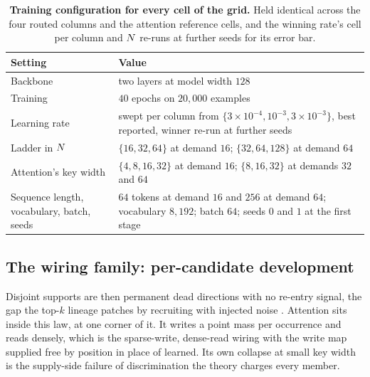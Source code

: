\begin{table}[H]
\centering
\scriptsize
\setlength{\tabcolsep}{3pt}
\caption{\textbf{Training configuration for every cell of the grid.} Held identical across the four routed columns and the attention reference cells, and the winning rate's cell per column and $N$ re-runs at further seeds for its error bar.}
\label{tab:recipe}
\begin{tabular}{@{}>{\raggedright\arraybackslash}p{3.4cm}>{\raggedright\arraybackslash}p{11.2cm}@{}}
\toprule
Setting & Value \\
\midrule
Backbone & two layers at model width $128$ \\
Training & $40$ epochs on $20{,}000$ examples \\
Learning rate & swept per column from $\{3 \times 10^{-4}, 10^{-3}, 3 \times 10^{-3}\}$, best reported, winner re-run at further seeds \\
Ladder in $N$ & $\{16, 32, 64\}$ at demand $16$; $\{32, 64, 128\}$ at demand $64$ \\
Attention's key width & $\{4, 8, 16, 32\}$ at demand $16$; $\{8, 16, 32\}$ at demands $32$ and $64$ \\
Sequence length, vocabulary, batch, seeds & $64$ tokens at demand $16$ and $256$ at demand $64$; vocabulary $8{,}192$; batch $64$; seeds $0$ and $1$ at the first stage \\
\bottomrule
\end{tabular}
\end{table}

\subsection{The wiring family: per-candidate development}
\label{apd:wirings}

Disjoint supports are then permanent dead directions with no re-entry signal, the gap the top-$k$ lineage patches by recruiting with injected noise \citep{shazeer2017moe}. Attention sits inside this law, at one corner of it. It writes a point mass per occurrence and reads densely, which is the sparse-write, dense-read wiring with the write map supplied free by position in place of learned. Its own collapse at small key width is the supply-side failure of discrimination the theory charges every member.

